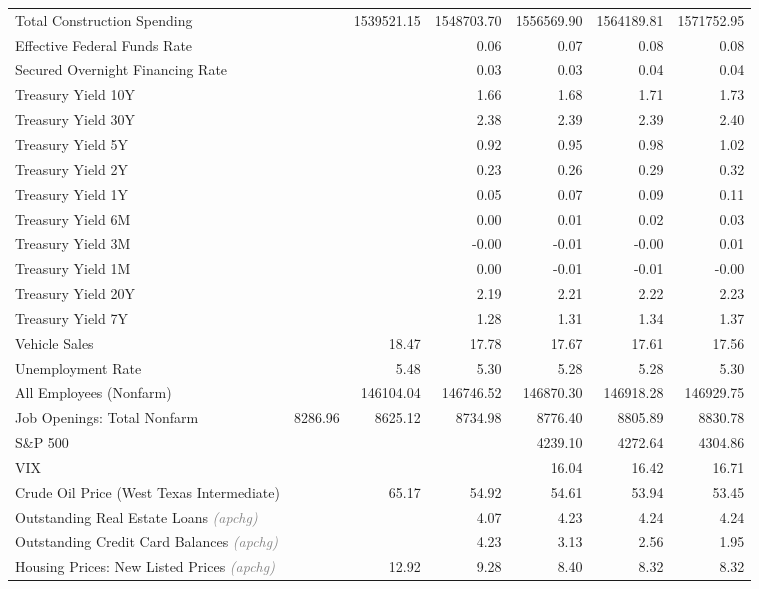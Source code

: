 \documentclass[11pt, letterpaper]{article}\usepackage[]{graphicx}\usepackage[]{color}
\begin{document}
\begin{table}[H]
\begin{tabular}{lrrrrrr}
  Total Construction Spending &  & 1539521.15 & 1548703.70 & 1556569.90 & 1564189.81 & 1571752.95 \\ 
  Effective Federal Funds Rate &  &  & 0.06 & 0.07 & 0.08 & 0.08 \\ 
  Secured Overnight Financing Rate &  &  & 0.03 & 0.03 & 0.04 & 0.04 \\ 
  Treasury Yield 10Y &  &  & 1.66 & 1.68 & 1.71 & 1.73 \\ 
  Treasury Yield 30Y &  &  & 2.38 & 2.39 & 2.39 & 2.40 \\ 
  Treasury Yield 5Y &  &  & 0.92 & 0.95 & 0.98 & 1.02 \\ 
  Treasury Yield 2Y &  &  & 0.23 & 0.26 & 0.29 & 0.32 \\ 
  Treasury Yield 1Y &  &  & 0.05 & 0.07 & 0.09 & 0.11 \\ 
  Treasury Yield 6M &  &  & 0.00 & 0.01 & 0.02 & 0.03 \\ 
  Treasury Yield 3M &  &  & -0.00 & -0.01 & -0.00 & 0.01 \\ 
  Treasury Yield 1M &  &  & 0.00 & -0.01 & -0.01 & -0.00 \\ 
  Treasury Yield 20Y &  &  & 2.19 & 2.21 & 2.22 & 2.23 \\ 
  Treasury Yield 7Y &  &  & 1.28 & 1.31 & 1.34 & 1.37 \\ 
  Vehicle Sales &  & 18.47 & 17.78 & 17.67 & 17.61 & 17.56 \\ 
  Unemployment Rate &  & 5.48 & 5.30 & 5.28 & 5.28 & 5.30 \\ 
  All Employees (Nonfarm) &  & 146104.04 & 146746.52 & 146870.30 & 146918.28 & 146929.75 \\ 
  Job Openings: Total Nonfarm & 8286.96 & 8625.12 & 8734.98 & 8776.40 & 8805.89 & 8830.78 \\ 
  S\&P 500 &  &  &  & 4239.10 & 4272.64 & 4304.86 \\ 
  VIX &  &  &  & 16.04 & 16.42 & 16.71 \\ 
  Crude Oil Price (West Texas Intermediate) &  & 65.17 & 54.92 & 54.61 & 53.94 & 53.45 \\ 
  Outstanding Real Estate Loans \textit{\footnotesize\textcolor{gray}{(apchg)}} &  &  & 4.07 & 4.23 & 4.24 & 4.24 \\ 
  Outstanding Credit Card Balances \textit{\footnotesize\textcolor{gray}{(apchg)}} &  &  & 4.23 & 3.13 & 2.56 & 1.95 \\ 
  Housing Prices: New Listed Prices \textit{\footnotesize\textcolor{gray}{(apchg)}} &  & 12.92 & 9.28 & 8.40 & 8.32 & 8.32 \\ 

\end{tabular}
\end{table}
\end{document}

